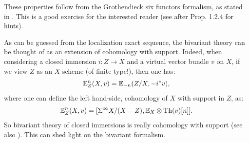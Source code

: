 These properties follow from the Grothendieck six functors formalism,
as stated in \cite[Introduction]{CD3}. This is a good exercise for the interested reader
(see \cite{Deg16} after Prop. 1.2.4 for hints).

\begin{rem}\label{rem:biv->cohsup}
As can be guessed from the localization exact sequence, the bivariant theory can be thought of as an extension of
cohomology with support. Indeed, when considering a closed immersion $i:Z \rightarrow X$ and a virtual vector bundle $v$ on $X$, if we view $Z$ as
an $X$-scheme (of finite type!), then one has:
$$
\mathbb E^{n}_Z(X,v)=\mathbb E_{-n}(Z/X,-i^*v),
$$
where one can define the left hand-side, cohomology of $X$ with support in $Z$, as:
$$
\mathbb E^{n}_Z(X,v)=[\Sigma^\infty X/(X-Z),\mathbb E_X\otimes \operatorname{Th}(v)[n]].
$$
So bivariant theory of closed immersions is really cohomology with support (see also \cite[Rem. 1.2.5]{Deg16}).
This can shed light on the bivariant formalism.
\end{rem}



